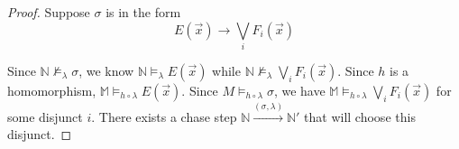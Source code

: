 		\begin{proof}

%
%
%
%

			Suppose $\sigma$ is in the form
				\[
				E(\vec{x}) \to \bigvee_i F_i(\vec{x})
				\]

			Since $\mathbb{N} \not\models_\lambda \sigma$, we know $\mathbb{N}
			\models_\lambda E(\vec{x})$ while $\mathbb{N} \not\models_\lambda
			\bigvee_i F_i(\vec{x})$. Since $h$ is a homomorphism, $\mathbb{M}
			\models_{h\circ\lambda} E(\vec{x})$. Since $M
			\models_{h\circ\lambda} \sigma$, we have $\mathbb{M}
			\models_{h\circ\lambda} \bigvee_i F_i(\vec{x})$ for some disjunct
			$i$. There exists a chase step $\mathbb{N}
			\xrightarrow{(\sigma,\lambda)} \mathbb{N}'$ that will choose this
			disjunct.


\end{proof}
